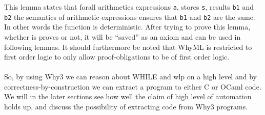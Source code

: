This lemma states that forall arithmetics expressions \texttt{a}, stores \texttt{s}, results \texttt{b1} and \texttt{b2} the semantics of arithmetic expressions ensures that \texttt{b1} and \texttt{b2} are the same.
In other words the function is deterministic. After trying to prove this lemma, whether is proves or not, it will be ``saved'' as an axiom and can be used in following lemmas.
It should furthermore be noted that WhyML is restricted to first order logic to only allow proof-obligations to be of first order logic.
\\~\\
So, by using Why3 we can reason about WHILE and wlp on a high level and by
correctness-by-construction we can extract a program to either C or OCaml code\cite{TODO}.
We will in the later sections see how well the claim of high level of automation holds up, and discuss the possibility of extracting code from Why3 programs.
